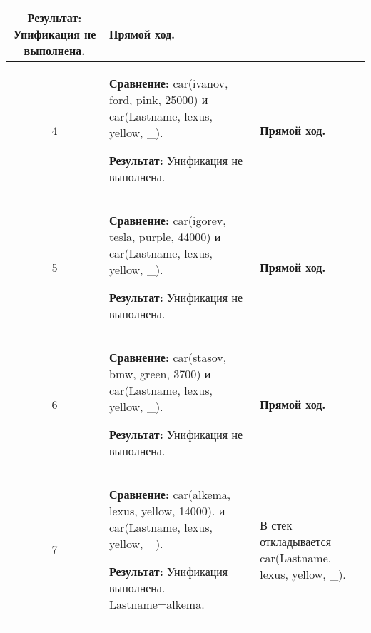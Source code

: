 \begin{longtable}{|c|p{}|p{}|}
    \textbf{Результат:} \newline
    Унификация не выполнена.
                       &
    \textbf{Прямой ход.}
                       \\ \hline

    4
                       &
    \textbf{Сравнение:} \newline
  car(ivanov, ford,    pink,   25000)
    \newline и \newline
    car(Lastname, lexus, yellow, \_).
    \newline

    \textbf{Результат:} \newline
    Унификация не выполнена.
                       &
    \textbf{Прямой ход.}
                       \\ \hline

    5
                       &
    \textbf{Сравнение:} \newline
  car(igorev, tesla,   purple, 44000)
    \newline и \newline
    car(Lastname, lexus, yellow, \_).
    \newline

    \textbf{Результат:} \newline
    Унификация не выполнена.
                       &
    \textbf{Прямой ход.}
                       \\ \hline

    6
                       &
    \textbf{Сравнение:} \newline
  car(stasov, bmw,     green,  3700)
    \newline и \newline
    car(Lastname, lexus, yellow, \_).
    \newline

    \textbf{Результат:} \newline
    Унификация не выполнена.
                       &
    \textbf{Прямой ход.}
                       \\ \hline

    7
                       &
\textbf{Сравнение:} \newline
  car(alkema, lexus,   yellow, 14000).
    \newline и \newline
    car(Lastname, lexus, yellow, \_).
    \newline

    \textbf{Результат:} \newline
    Унификация выполнена.\newline{}
    Lastname=alkema.
                       &
    В стек откладывается\newline
    car(Lastname, lexus, yellow, \_).
    \newline


\end{longtable}
